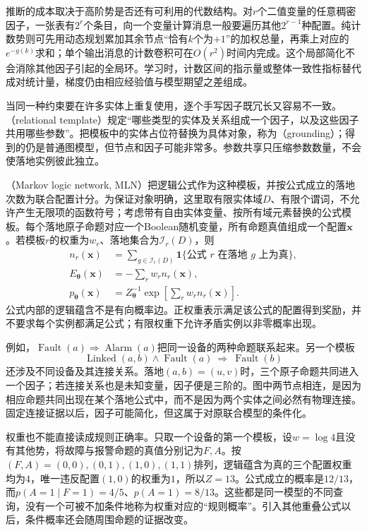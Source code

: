 推断的成本取决于高阶势是否还有可利用的代数结构。对$r$个二值变量的任意稠密因子，一张表有$2^r$个条目，向一个变量计算消息一般要遍历其他$2^{r-1}$种配置。纯计数势则可先用动态规划累加其余节点“恰有$k$个为$+1$”的加权总量，再乘上对应的$e^{-g(k)}$求和；单个输出消息的计数卷积可在$O(r^2)$时间内完成。这个局部简化不会消除其他因子引起的全局环。学习时，计数区间的指示量或整体一致性指标替代成对统计量，梯度仍由相应经验值与模型期望之差组成。

当同一种约束要在许多实体上重复使用，逐个手写因子既冗长又容易不一致。（relational template）规定“哪些类型的实体及关系组成一个因子，以及这些因子共用哪些参数”。把模板中的实体占位符替换为具体对象，称为（grounding）；得到的仍是普通图模型，但节点和因子可能非常多。参数共享只压缩参数数量，不会使落地实例彼此独立。

（Markov logic network, MLN）把逻辑公式作为这种模板，并按公式成立的落地次数为联合配置计分。为保证对象明确，这里取有限实体域$D$、有限个谓词，不允许产生无限项的函数符号；考虑带有自由实体变量、按所有域元素替换的公式模板。每个落地原子命题对应一个Boolean随机变量，所有命题真值组成一个配置$\bm{x}$。若模板$r$的权重为$w_r$、落地集合为$\mathcal{I}_r(D)$，则
\begin{equation}
  \begin{aligned}
    n_r(\bm{x})
      &=\sum_{g\in\mathcal{I}_r(D)}
           \mathbf{1}\{\text{公式 }r\text{ 在落地 }g\text{ 上为真}\},\\
    E_{\bm{\theta}}(\bm{x})&=-\sum_rw_rn_r(\bm{x}),\\
    p_{\bm{\theta}}(\bm{x})
      &=Z_{\bm{\theta}}^{-1}
          \exp\!\left[\sum_rw_rn_r(\bm{x})\right].
  \end{aligned}
  \label{eq:pgm-energy-models-mln}
\end{equation}
公式内部的逻辑蕴含不是有向概率边。正权重表示满足该公式的配置得到奖励，并不要求每个实例都满足公式；有限权重下允许矛盾实例以非零概率出现。

例如，$\operatorname{Fault}(a)\Rightarrow\operatorname{Alarm}(a)$把同一设备的两种命题联系起来。另一个模板
\[
  \operatorname{Linked}(a,b)\land\operatorname{Fault}(a)
       \ \Rightarrow\ \operatorname{Fault}(b)
\]
还涉及不同设备及其连接关系。落地$(a,b)=(u,v)$时，三个原子命题共同进入一个因子；若连接关系也是未知变量，因子便是三阶的。图中两节点相连，是因为相应命题共同出现在某个落地公式中，而不是因为两个实体之间必然有物理连接。固定连接证据以后，因子可能简化，但这属于对原联合模型的条件化。

权重也不能直接读成规则正确率。只取一个设备的第一个模板，设$w=\log4$且没有其他势，将故障与报警命题的真值分别记为$F,A$。按$(F,A)=(0,0),(0,1),(1,0),(1,1)$排列，逻辑蕴含为真的三个配置权重均为$4$，唯一违反配置$(1,0)$的权重为$1$，所以$Z=13$。公式成立的概率是$12/13$，而$p(A=1\mid F=1)=4/5$、$p(A=1)=8/13$。这些都是同一模型的不同查询，没有一个可被不加条件地称为权重对应的“规则概率”。引入其他重叠公式以后，条件概率还会随周围命题的证据改变。

